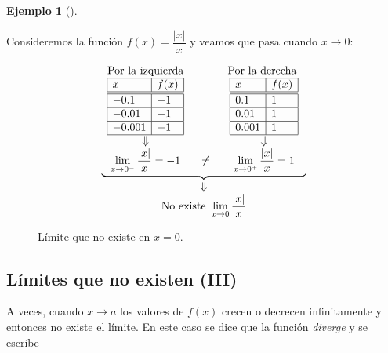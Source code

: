 \documentclass[
  a4paper,
]{scrreport}
\theoremstyle{plain}
\theoremstyle{definition}
\theoremstyle{plain}
\theoremstyle{plain}
\theoremstyle{definition}
\newtheorem{example}{Ejemplo}[chapter]
\theoremstyle{definition}
\theoremstyle{remark}
\begin{document}
\begin{example}[]\protect\hypertarget{exm-limites-no-existen-2}{}\label{exm-limites-no-existen-2}

Consideremos la función \(f(x)=\dfrac{\lvert x\rvert}{x}\) y veamos que
pasa cuando \(x\to 0\):

\[\begin{array}{c}
\underbrace{\begin{array}{ccc}
\mbox{Por la izquierda} & \qquad & \mbox{Por la derecha }\\
\begin{array}{|l|l|}
\hline
x      & f(x)   \\
\hline\hline
 -0.1   & -1       \\
\hline
 -0.01   & -1     \\
\hline
 -0.001  & -1   \\
\hline
\end{array}
& &
\begin{array}{|l|l|}
\hline
x      & f(x)   \\
\hline\hline
 0.1    & 1       \\
\hline
 0.01   & 1    \\
\hline
 0.001  & 1   \\
\hline
\end{array}\\
\Downarrow & & \Downarrow\\
\displaystyle \lim_{x\to 0^-}\frac{|x|}{x}=-1
&\neq &
\displaystyle \lim_{x\to 0^+}\frac{|x|}{x}=1
\end{array}}\\
\Downarrow\\
\displaystyle \mbox{No existe }\lim_{x\to 0}\frac{|x|}{x}
\end{array}
\]

\begin{figure}
\centering

\caption{Límite que no existe en \(x=0\).}
\end{figure}

\end{example}

\subsection{Límites que no existen
(III)}\label{luxedmites-que-no-existen-iii}

A veces, cuando \(x\to a\) los valores de \(f(x)\) crecen o decrecen
infinitamente y entonces no existe el límite. En este caso se dice que
la función \emph{diverge} y se escribe
\end{document}
